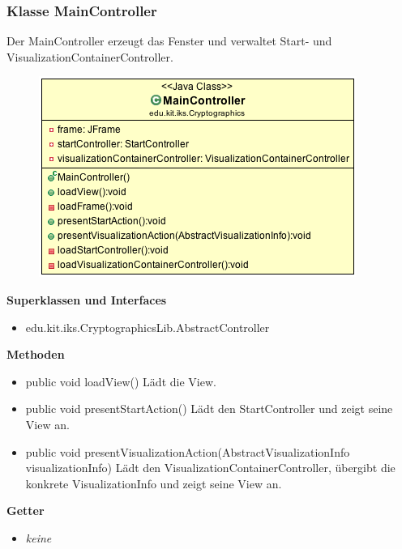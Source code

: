 \documentclass{article}
\begin{document}
    \subsubsection{Klasse MainController}
      Der MainController erzeugt das Fenster und verwaltet Start- und VisualizationContainerController.
      \begin{figure}[H]
        \centering
        \includegraphics{resources/edu-kit-iks-Cryptographics-MainController}
      \end{figure}

      \textbf{Superklassen und Interfaces}
      \begin{itemize}
        \item edu.kit.iks.CryptographicsLib.AbstractController
      \end{itemize}
      
      \textbf{Methoden}
      \begin{itemize}
        \item public void loadView() \newline
        Lädt die View.
        \item public void presentStartAction() \newline
        Lädt den StartController und zeigt seine View an.
        \item public void presentVisualizationAction(AbstractVisualizationInfo visualizationInfo) \newline
        Lädt den VisualizationContainerController, übergibt die konkrete VisualizationInfo und zeigt seine View an.
      \end{itemize}

      \textbf{Getter}
      \begin{itemize}
        \item \textit{keine}
      \end{itemize}
\end{document}
